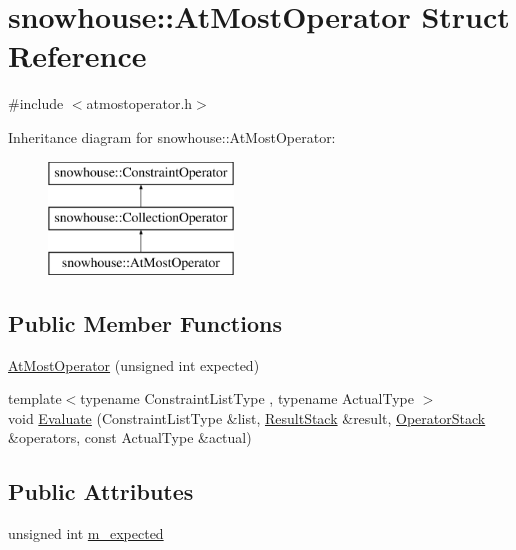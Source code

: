 \hypertarget{structsnowhouse_1_1AtMostOperator}{}\section{snowhouse\+::At\+Most\+Operator Struct Reference}
\label{structsnowhouse_1_1AtMostOperator}


{\ttfamily \#include $<$atmostoperator.\+h$>$}

Inheritance diagram for snowhouse\+::At\+Most\+Operator\+:\begin{figure}[H]
\begin{center}
\leavevmode
\includegraphics[height=3.000000cm]{structsnowhouse_1_1AtMostOperator}
\end{center}
\end{figure}
\subsection*{Public Member Functions}
\begin{DoxyCompactItemize}
\item 
\mbox{\hyperlink{structsnowhouse_1_1AtMostOperator_a46c7b3ee03af3a618fb8b17c215b61db}{At\+Most\+Operator}} (unsigned int expected)
\item 
{\footnotesize template$<$typename Constraint\+List\+Type , typename Actual\+Type $>$ }\\void \mbox{\hyperlink{structsnowhouse_1_1AtMostOperator_ab38aed2adc98483c2817c53a116a553a}{Evaluate}} (Constraint\+List\+Type \&list, \mbox{\hyperlink{namespacesnowhouse_a719169b1315a13161c15f25e600a8f51}{Result\+Stack}} \&result, \mbox{\hyperlink{namespacesnowhouse_adcb10e215e6a4bbcb35722a9c7270fc6}{Operator\+Stack}} \&operators, const Actual\+Type \&actual)
\end{DoxyCompactItemize}
\subsection*{Public Attributes}
\begin{DoxyCompactItemize}
\item 
unsigned int \mbox{\hyperlink{structsnowhouse_1_1AtMostOperator_a0b796ace1e23f4d0bc53918706b48c3e}{m\+\_\+expected}}
\end{DoxyCompactItemize}
